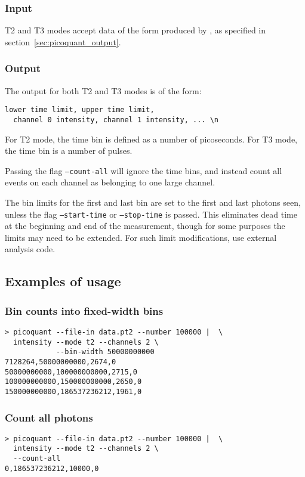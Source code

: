 \subsubsection{Input}
T2 and T3 modes accept data of the form produced by , as specified in section~\ref{sec:picoquant_output}.

\subsubsection{Output}
The output for both T2 and T3 modes is of the form:
\begin{verbatim}
lower time limit, upper time limit, 
  channel 0 intensity, channel 1 intensity, ... \n
\end{verbatim}
For T2 mode, the time bin is defined as a number of picoseconds. For T3 mode, the time bin is a number of pulses.

Passing the flag \texttt{--count-all} will ignore the time bins, and instead count all events on each channel as belonging to one large channel. 

The bin limits for the first and last bin are set to the first and last photons seen, unless the flag \texttt{--start-time} or \texttt{--stop-time} is passed. This eliminates dead time at the beginning and end of the measurement, though for some purposes the limits may need to be extended. For such limit modifications, use external analysis code.

\subsection{Examples of usage}
\subsubsection{Bin counts into fixed-width bins}
\begin{verbatim}
> picoquant --file-in data.pt2 --number 100000 |  \
  intensity --mode t2 --channels 2 \
            --bin-width 50000000000
7128264,50000000000,2674,0
50000000000,100000000000,2715,0
100000000000,150000000000,2650,0
150000000000,186537236212,1961,0
\end{verbatim}

\subsubsection{Count all photons}
\begin{verbatim}
> picoquant --file-in data.pt2 --number 100000 |  \
  intensity --mode t2 --channels 2 \
  --count-all
0,186537236212,10000,0
\end{verbatim}

